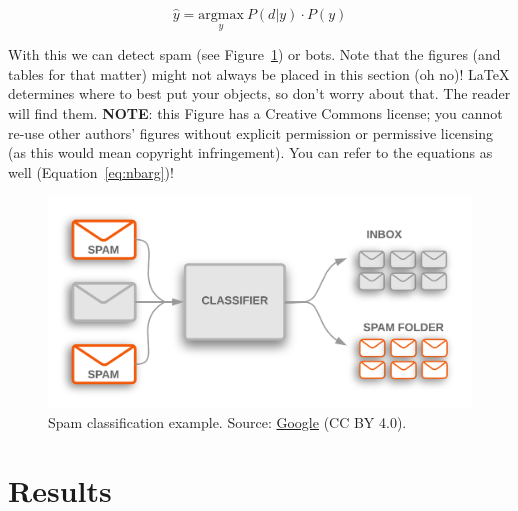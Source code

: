 \documentclass[11pt, a4paper]{article}
\begin{document}
\begin{equation} \label{eq:nbarg}
    \hat{y} = \underset{y}{\mathrm{argmax}} \ P(d | y) \cdot P(y)
\end{equation}

With this we can detect spam (see Figure~\ref{fig:spam}) or bots.  Note that the figures (and tables for that matter) might not always be placed in this section (oh no)! \LaTeX{} determines where to best put your objects, so don't worry about that. The reader will find them. \textbf{NOTE}: this Figure has a Creative Commons license; you cannot re-use other authors' figures without explicit permission or permissive licensing (as this would mean copyright infringement). You can refer to the equations as well (Equation~\ref{eq:nbarg})!

\begin{figure}
    \centering
    \includegraphics[width=\textwidth]{spam.png}
    \caption{Spam classification example. Source: \href{https://developers.google.com/machine-learning/guides/text-classification}{Google} (CC BY 4.0).}
    \label{fig:spam}
\end{figure}

\section{Results}
\end{document}
